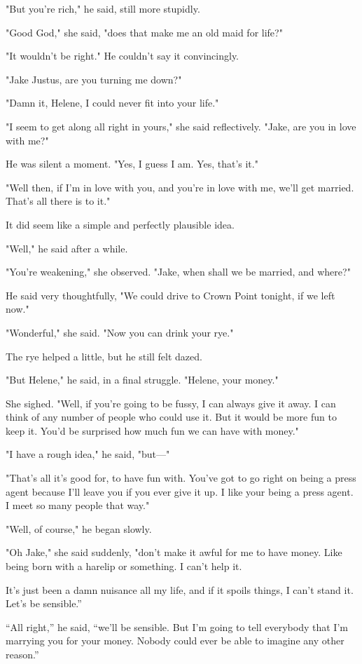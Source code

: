 \documentclass{novel}
\begin{document}
"But you're rich," he said, still more stupidly.

"Good God," she said, "does that make me an old maid for life?"

"It wouldn't be right." He couldn't say it convincingly.

"Jake Justus, are you turning me down?"

"Damn it, Helene, I could never fit into your life."

"I seem to get along all right in yours," she said reflectively. "Jake, are you in love with me?"

He was silent a moment. "Yes, I guess I am. Yes, that's it."

"Well then, if I'm in love with you, and you're in love with me, we'll get married. That's all there is to it."

It did seem like a simple and perfectly plausible idea.

"Well," he said after a while.

"You're weakening," she observed. "Jake, when shall we be married, and where?"

He said very thoughtfully, "We could drive to Crown Point tonight, if we left now."

"Wonderful," she said. "Now you can drink your rye."

The rye helped a little, but he still felt dazed.

"But Helene," he said, in a final struggle. "Helene, your money."

She sighed. "Well, if you're going to be fussy, I can always give it away. I can think of any number of people who could use it. But it would be more fun to keep it. You'd be surprised how much fun we can have with money."

"I have a rough idea," he said, "but—"

"That's all it's good for, to have fun with. You've got to go right on being a press agent because I'll leave you if you ever give it up. I like your being a press agent. I meet so many people that way."

"Well, of course," he began slowly.

"Oh Jake," she said suddenly, "don't make it awful for me to have money. Like being born with a harelip or something. I can't help it.

It’s just been a damn nuisance all my life, and if it spoils things, I can’t stand it. Let’s be sensible.”

“All right,” he said, “we’ll be sensible. But I’m going to tell everybody that I'm marrying you for your money. Nobody could ever be able to imagine any other reason.”
\end{document}
